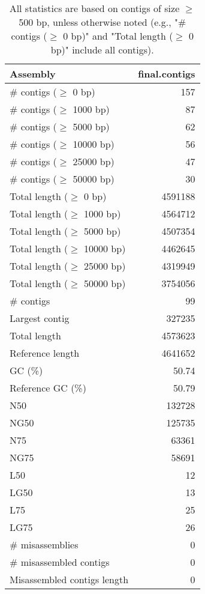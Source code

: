 \documentclass[12pt,a4paper]{article}
\begin{document}
\begin{table}[ht]
\begin{center}
\caption{All statistics are based on contigs of size $\geq$ 500 bp, unless otherwise noted (e.g., "\# contigs ($\geq$ 0 bp)" and "Total length ($\geq$ 0 bp)" include all contigs).}
\begin{tabular}{|l*{1}{|r}|}
\hline
Assembly & final.contigs \\ \hline
\# contigs ($\geq$ 0 bp) & 157 \\ \hline
\# contigs ($\geq$ 1000 bp) & 87 \\ \hline
\# contigs ($\geq$ 5000 bp) & 62 \\ \hline
\# contigs ($\geq$ 10000 bp) & 56 \\ \hline
\# contigs ($\geq$ 25000 bp) & 47 \\ \hline
\# contigs ($\geq$ 50000 bp) & 30 \\ \hline
Total length ($\geq$ 0 bp) & 4591188 \\ \hline
Total length ($\geq$ 1000 bp) & 4564712 \\ \hline
Total length ($\geq$ 5000 bp) & 4507354 \\ \hline
Total length ($\geq$ 10000 bp) & 4462645 \\ \hline
Total length ($\geq$ 25000 bp) & 4319949 \\ \hline
Total length ($\geq$ 50000 bp) & 3754056 \\ \hline
\# contigs & 99 \\ \hline
Largest contig & 327235 \\ \hline
Total length & 4573623 \\ \hline
Reference length & 4641652 \\ \hline
GC (\%) & 50.74 \\ \hline
Reference GC (\%) & 50.79 \\ \hline
N50 & 132728 \\ \hline
NG50 & 125735 \\ \hline
N75 & 63361 \\ \hline
NG75 & 58691 \\ \hline
L50 & 12 \\ \hline
LG50 & 13 \\ \hline
L75 & 25 \\ \hline
LG75 & 26 \\ \hline
\# misassemblies & 0 \\ \hline
\# misassembled contigs & 0 \\ \hline
Misassembled contigs length & 0 \\ \hline

\end{tabular}
\end{center}
\end{table}
\end{document}
